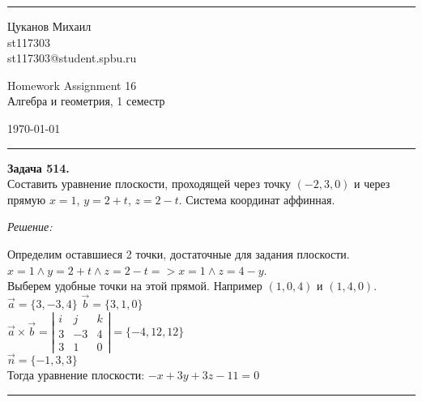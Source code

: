 \documentclass[a4paper, 12pt]{article}
\newenvironment{problem}[2][Задача]
    { \begin{mdframed}[backgroundcolor=gray!10] \textbf{#1 #2.} \\}
    {  \end{mdframed}}
\newenvironment{solution}
    {\textit{Решение: }}
    {\noindent\rule{7in}{1.5pt}}
\begin{document}

\fancyhead[C]{}
\hrule \medskip %
\begin{minipage}{0.295\textwidth}
\raggedright\footnotesize
Цуканов Михаил \hfill\\
st117303 \hfill\\
st117303@student.spbu.ru
\end{minipage}
\begin{minipage}{0.4\textwidth}
\centering\large
Homework Assignment 16\\
\normalsize
Алгебра и геометрия, 1 семестр\\
\end{minipage}
\begin{minipage}{0.295\textwidth}
\raggedleft
\today\hfill\\
\end{minipage}
\medskip\hrule
\bigskip




\begin{problem}{514}
Составить уравнение плоскости, проходящей через точку $(-2,3,0)$ и через прямую $x=1$, $y=2+t$, $z=2-t$. Система координат аффинная.
\end{problem}
\begin{solution}

Определим оставшиеся 2 точки, достаточные для задания плоскости. \\
$x=1 \land y=2+t \land z=2-t => x=1 \land z = 4 - y$. \\
Выберем удобные точки на этой прямой. Например $(1, 0, 4)$ и $(1, 4, 0)$. \\
$\vec{a} = \{3, -3, 4\}$
$\vec{b} = \{3, 1, 0\}$
\\
$
\vec{a} \times \vec{b} =
\left|
  \begin{array}{rrr}
    i & j & k \\
    3 & -3 & 4 \\
    3 & 1 & 0
  \end{array}
\right|
= \{-4, 12, 12\}
$ \\
$\vec{n} = \{-1, 3, 3\}$ \\
Тогда уравнение плоскости: $-x + 3y + 3z - 11 = 0$

\end{solution}
\end{document}
